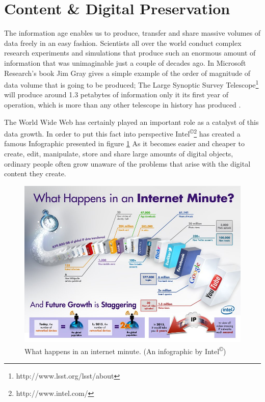 \section{Content \& Digital Preservation}
The information age enables us to produce, transfer and share massive volumes of data freely in an easy fashion. Scientists all over the world conduct complex research experiments and simulations that produce such an enormous amount of information that was unimaginable just a couple of decades ago. In Microsoft Research's book Jim Gray gives a simple example of the order of magnitude of data volume that is going to be produced; The Large Synoptic Survey Telescope\footnote{http://www.lsst.org/lsst/about} will produce around 1.3 petabytes of information only it its first year of operation, which is more than any other telescope in history has produced \cite{Gray:2009:fourthparadigm}.

The World Wide Web has certainly played an important role as a catalyst of this data growth. In order to put this fact into perspective Intel\textsuperscript{\copyright}\footnote{http://www.intel.com/} has created a famous Infographic presented in figure \ref{fig:intel_oneminute_internet}
As it becomes easier and cheaper to create, edit, manipulate, store and share large amounts of digital objects, ordinary people often grow unaware of the problems that arise with the digital content they create.

\begin{figure}[htb]
\begin{center}
\includegraphics[width=6in]{figures/introduction/intel_oneminute_internet.jpg}
\caption{What happens in an internet minute. (An infographic by Intel\textsuperscript{\copyright})}
\label{fig:intel_oneminute_internet}
\end{center}
\end{figure}

